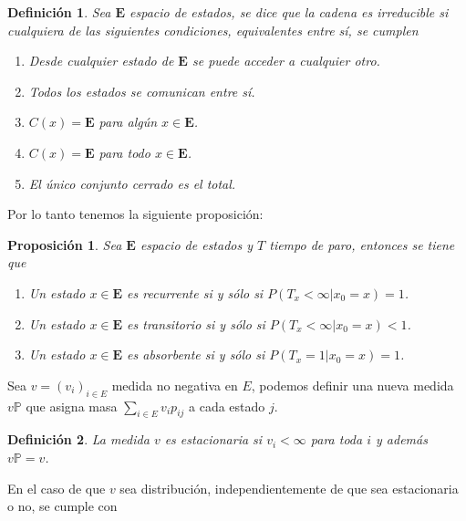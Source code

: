 \documentclass{article}
\newtheorem{Def}{Definición}[section]
\newtheorem{Prop}{Proposición}[section]
\newcommand{\Eb}{\mathbf{E}}
\newcommand{\prob}{\mathbb{P}}
\numberwithin{equation}{section}
\begin{document}
\begin{Def}
Sea $\Eb$ espacio de estados, se dice que la cadena es irreducible si cualquiera de las siguientes condiciones, equivalentes entre s\'i,  se cumplen
\begin{enumerate}
\item[a) ] Desde cualquier estado de $\Eb$ se puede acceder a cualquier otro.

\item[b) ] Todos los estados se comunican entre s\'i.

\item[c) ] $C\left(x\right)=\Eb$ para alg\'un $x\in\Eb$.

\item[d) ] $C\left(x\right)=\Eb$ para todo $x\in\Eb$.

\item[e) ] El \'unico conjunto cerrado es el total.
\end{enumerate}
\end{Def}
Por lo tanto tenemos la siguiente proposici\'on:
\begin{Prop}  Sea $\Eb$ espacio de estados y $T$ tiempo de paro, entonces se tiene que
\begin{enumerate}
\item[a) ] Un estado $x\in\Eb$ es recurrente si y s\'olo si $P\left(T_{x}<\infty|x_{0}=x\right)=1$.

\item[b) ] Un estado $x\in\Eb$ es transitorio si y s\'olo si $P\left(T_{x}<\infty|x_{0}=x\right)<1$.

\item[c) ] Un estado $x\in\Eb$ es absorbente si y s\'olo si $P\left(T_{x}=1|x_{0}=x\right)=1$.


\end{enumerate}
\end{Prop}


Sea $v=\left(v_{i}\right)_{i\in E}$ medida no negativa en $E$, podemos definir una nueva medida $v\prob$ que asigna masa $\sum_{i\in E}v_{i}p_{ij}$ a cada estado $j$.

\begin{Def}
La medida $v$ es estacionaria si $v_{i}<\infty$ para toda $i$ y adem\'as $v\prob=v$.
\end{Def}
En el caso de que $v$ sea distribuci\'on, independientemente de que sea estacionaria o no, se cumple con
\end{document}
